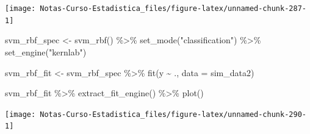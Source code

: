 \documentclass[
  12pt,
]{book}
\newenvironment{Shaded}{\begin{snugshade}}{\end{snugshade}}
\newcommand{\AttributeTok}[1]{\textcolor[rgb]{0.77,0.63,0.00}{#1}}
\newcommand{\FunctionTok}[1]{\textcolor[rgb]{0.00,0.00,0.00}{#1}}
\newcommand{\NormalTok}[1]{#1}
\newcommand{\OtherTok}[1]{\textcolor[rgb]{0.56,0.35,0.01}{#1}}
\newcommand{\SpecialCharTok}[1]{\textcolor[rgb]{0.00,0.00,0.00}{#1}}
\newcommand{\StringTok}[1]{\textcolor[rgb]{0.31,0.60,0.02}{#1}}
\theoremstyle{definition}
\theoremstyle{definition}
\theoremstyle{definition}
\theoremstyle{definition}
\theoremstyle{remark}
\begin{document}
\begin{center}\texttt{[image: Notas-Curso-Estadistica\_files/figure-latex/unnamed-chunk-287-1]} \end{center}

\begin{Shaded}
\begin{Highlighting}[]
\NormalTok{svm\_rbf\_spec }\OtherTok{\textless{}{-}} \FunctionTok{svm\_rbf}\NormalTok{() }\SpecialCharTok{\%\textgreater{}\%}
    \FunctionTok{set\_mode}\NormalTok{(}\StringTok{"classification"}\NormalTok{) }\SpecialCharTok{\%\textgreater{}\%}
    \FunctionTok{set\_engine}\NormalTok{(}\StringTok{"kernlab"}\NormalTok{)}
\end{Highlighting}
\end{Shaded}

\begin{Shaded}
\begin{Highlighting}[]
\NormalTok{svm\_rbf\_fit }\OtherTok{\textless{}{-}}\NormalTok{ svm\_rbf\_spec }\SpecialCharTok{\%\textgreater{}\%}
    \FunctionTok{fit}\NormalTok{(y }\SpecialCharTok{\textasciitilde{}}\NormalTok{ ., }\AttributeTok{data =}\NormalTok{ sim\_data2)}
\end{Highlighting}
\end{Shaded}

\begin{Shaded}
\begin{Highlighting}[]
\NormalTok{svm\_rbf\_fit }\SpecialCharTok{\%\textgreater{}\%}
    \FunctionTok{extract\_fit\_engine}\NormalTok{() }\SpecialCharTok{\%\textgreater{}\%}
    \FunctionTok{plot}\NormalTok{()}
\end{Highlighting}
\end{Shaded}

\begin{center}\texttt{[image: Notas-Curso-Estadistica\_files/figure-latex/unnamed-chunk-290-1]} \end{center}
\end{document}
